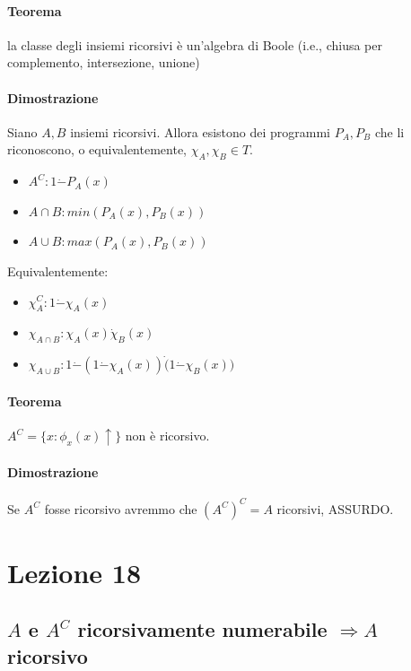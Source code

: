 \documentclass{article}
\begin{document}
\paragraph{Teorema} la classe degli insiemi ricorsivi è un'algebra di Boole (i.e., chiusa per complemento, intersezione, unione)
\paragraph{Dimostrazione} Siano $A, B$ insiemi ricorsivi. Allora esistono dei programmi $P_A, P_B$ che li riconoscono, o equivalentemente, $\chi_A,\chi_B \in T$.
\begin{itemize}
	\item $A^C: 1 \dot{-} P_A(x)$
	\item $A \cap B: min(P_A(x),P_B(x))$
	\item $A \cup B: max(P_A(x),P_B(x))$
\end{itemize}

Equivalentemente:
\begin{itemize}
	\item $\chi_A^C: 1 \dot{-} \chi_A(x)$
	\item $\chi_{A \cap B}: \chi_A(x) \dot \chi_B(x)$
	\item $\chi_{A \cup B}: 1 \dot{-} (1 \dot{-} \chi_A(x)) \dot (1 \dot{-} \chi_B(x))$
\end{itemize}



\paragraph{Teorema} $A^C= \{ x:\phi_x(x)\uparrow \}$ non è ricorsivo.
\paragraph{Dimostrazione} Se $A^C$ fosse ricorsivo avremmo che $(A^C)^C=A$ ricorsivi, ASSURDO.


\section{Lezione 18}
\subsection{$A$ e $A^C$ ricorsivamente numerabile $\Rightarrow A$ ricorsivo}
\end{document}

